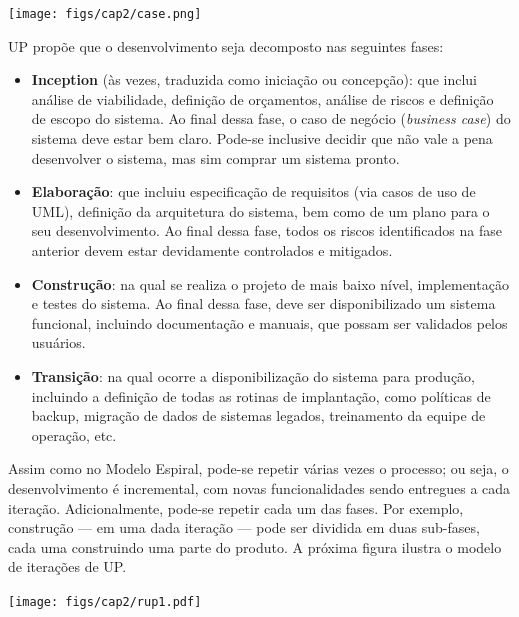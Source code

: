 \documentclass[
  11pt,
  twoside]{book}
\let\origfigure\figure
\let\endorigfigure\endfigure
\renewenvironment{figure}[1][2] {
    \expandafter\origfigure\expandafter[!h]
} {
    \endorigfigure
}
\begin{document}
\begin{figure}
\centering
\texttt{[image: figs/cap2/case.png]}
\caption{Projeto usando ferramenta CASE. Figura gentilmente cedida pelos
desenvolvedores do sistema ArgoUML.}
\end{figure}

UP propõe que o desenvolvimento seja decomposto nas seguintes fases:

\begin{itemize}
\item
  \textbf{Inception}  (às vezes, traduzida como
  iniciação ou concepção): que inclui análise de viabilidade, definição
  de orçamentos, análise de riscos e definição de escopo do sistema. Ao
  final dessa fase, o caso de negócio (\emph{business case}) do sistema
  deve estar bem claro. Pode-se inclusive decidir que não vale a pena
  desenvolver o sistema, mas sim comprar um sistema pronto.
\item
  \textbf{Elaboração}: que incluiu especificação de requisitos (via
  casos de uso de UML), definição da arquitetura do sistema, bem como de
  um plano para o seu desenvolvimento. Ao final dessa fase, todos os
  riscos identificados na fase anterior devem estar devidamente
  controlados e mitigados.
\item
  \textbf{Construção}: na qual se realiza o projeto de mais baixo nível,
  implementação e testes do sistema. Ao final dessa fase, deve ser
  disponibilizado um sistema funcional, incluindo documentação e
  manuais, que possam ser validados pelos usuários.
\item
  \textbf{Transição}: na qual ocorre a disponibilização do sistema para
  produção, incluindo a definição de todas as rotinas de implantação,
  como políticas de backup, migração de dados de sistemas legados,
  treinamento da equipe de operação, etc.
\end{itemize}

Assim como no Modelo Espiral, pode-se repetir várias vezes o processo;
ou seja, o desenvolvimento é incremental, com novas funcionalidades
sendo entregues a cada iteração. Adicionalmente, pode-se repetir cada um
das fases. Por exemplo, construção --- em uma dada iteração --- pode ser
dividida em duas sub-fases, cada uma construindo uma parte do produto. A
próxima figura ilustra o modelo de iterações de UP.

\begin{figure}
\centering
\texttt{[image: figs/cap2/rup1.pdf]}
\caption{Fases e iterações do Processo Unificado (UP). Repetições são
possíveis em cada fase (auto-laços). E também pode-se repetir todo o
fluxo (laço externo), para gerar mais um incremento de produto.}
\end{figure}
\end{document}
